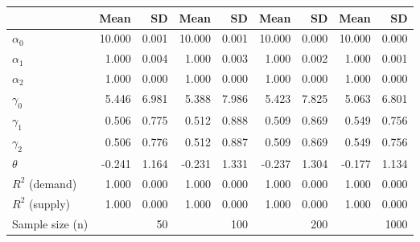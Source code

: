 
\begin{tabular}[t]{lrrrrrrrr}
\toprule
  & Mean & SD & Mean  & SD  & Mean   & SD   & Mean    & SD   \\
\midrule
$\alpha_{0}$ & 10.000 & 0.001 & 10.000 & 0.001 & 10.000 & 0.000 & 10.000 & 0.000\\
$\alpha_{1}$ & 1.000 & 0.004 & 1.000 & 0.003 & 1.000 & 0.002 & 1.000 & 0.001\\
$\alpha_{2}$ & 1.000 & 0.000 & 1.000 & 0.000 & 1.000 & 0.000 & 1.000 & 0.000\\
$\gamma_{0}$ & 5.446 & 6.981 & 5.388 & 7.986 & 5.423 & 7.825 & 5.063 & 6.801\\
$\gamma_{1}$ & 0.506 & 0.775 & 0.512 & 0.888 & 0.509 & 0.869 & 0.549 & 0.756\\
$\gamma_{2}$ & 0.506 & 0.776 & 0.512 & 0.887 & 0.509 & 0.869 & 0.549 & 0.756\\
$\theta$ & -0.241 & 1.164 & -0.231 & 1.331 & -0.237 & 1.304 & -0.177 & 1.134\\
$R^{2}$ (demand) & 1.000 & 0.000 & 1.000 & 0.000 & 1.000 & 0.000 & 1.000 & 0.000\\
$R^{2}$ (supply) & 1.000 & 0.000 & 1.000 & 0.000 & 1.000 & 0.000 & 1.000 & 0.000\\
Sample size (n) &  & 50 &  & 100 &  & 200 &  & 1000\\
\bottomrule
\end{tabular}

